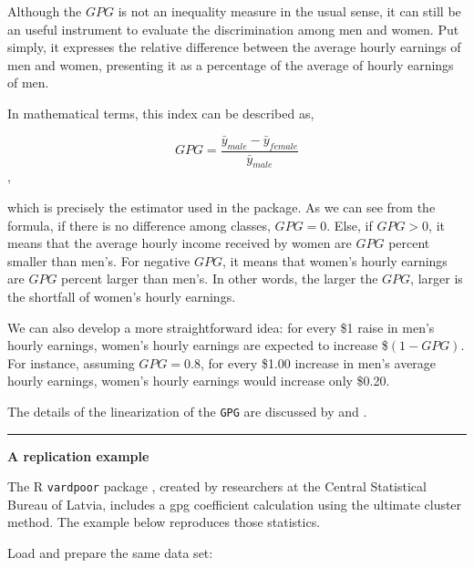 \documentclass[
]{book}
\begin{document}
Although the \(GPG\) is not an inequality measure in the usual sense, it can still be an useful instrument to evaluate the discrimination among men and women. Put simply, it expresses the relative difference between the average hourly earnings of men and women, presenting it as a percentage of the average of hourly earnings of men.

In mathematical terms, this index can be described as,

\[ GPG = \frac{ \bar{y}_{male} - \bar{y}_{female} }{ \bar{y}_{male} } \],

which is precisely the estimator used in the package. As we can see from the formula, if there is no difference among classes, \(GPG = 0\). Else, if \(GPG > 0\), it means that the average hourly income received by women are \(GPG\) percent smaller than men's. For negative \(GPG\), it means that women's hourly earnings are \(GPG\) percent larger than men's. In other words, the larger the \(GPG\), larger is the shortfall of women's hourly earnings.

We can also develop a more straightforward idea: for every \$1 raise in men's hourly earnings, women's hourly earnings are expected to increase \$\((1-GPG)\). For instance, assuming \(GPG = 0.8\), for every \$1.00 increase in men's average hourly earnings, women's hourly earnings would increase only \$0.20.

The details of the linearization of the \texttt{GPG} are discussed by \textcite{deville1999} and \textcite{osier2009}.

\begin{center}\rule{0.5\linewidth}{0.5pt}\end{center}

\textbf{A replication example}

The R \texttt{vardpoor} package \autocite{vardpoor}, created by researchers at the Central Statistical Bureau of Latvia, includes a gpg coefficient calculation using the ultimate cluster method. The example below reproduces those statistics.

Load and prepare the same data set:
\end{document}
